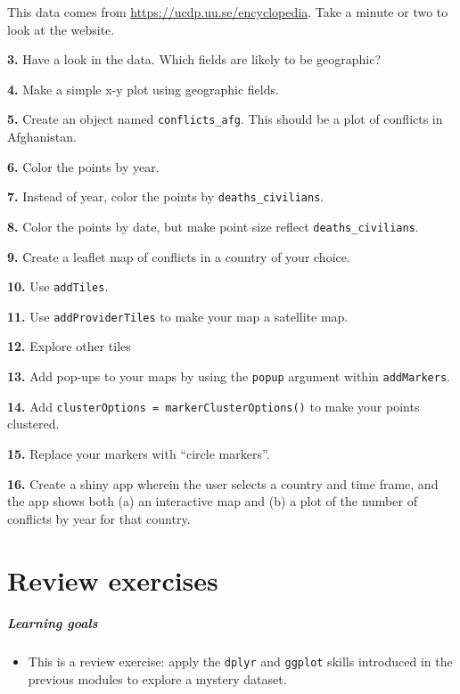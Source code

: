 \documentclass[
]{book}
\providecommand{\tightlist}{%
  \setlength{\itemsep}{0pt}\setlength{\parskip}{0pt}}
\begin{document}
This data comes from \url{https://ucdp.uu.se/encyclopedia}. Take a minute or two to look at the website.

\textbf{3.} Have a look in the data. Which fields are likely to be geographic?

\textbf{4.} Make a simple x-y plot using geographic fields.

\textbf{5.} Create an object named \texttt{conflicts\_afg}. This should be a plot of conflicts in Afghanistan.

\textbf{6.} Color the points by year.

\textbf{7.} Instead of year, color the points by \texttt{deaths\_civilians}.

\textbf{8.} Color the points by date, but make point size reflect \texttt{deaths\_civilians}.

\textbf{9.} Create a leaflet map of conflicts in a country of your choice.

\textbf{10.} Use \texttt{addTiles}.

\textbf{11.} Use \texttt{addProviderTiles} to make your map a satellite map.

\textbf{12.} Explore other tiles

\textbf{13.} Add pop-ups to your maps by using the \texttt{popup} argument within \texttt{addMarkers}.

\textbf{14.} Add \texttt{clusterOptions\ =\ markerClusterOptions()} to make your points clustered.

\textbf{15.} Replace your markers with ``circle markers''.

\textbf{16.} Create a shiny app wherein the user selects a country and time frame, and the app shows both (a) an interactive map and (b) a plot of the number of conflicts by year for that country.

\hypertarget{part-review-exercises}{%
\part{Review exercises}\label{part-review-exercises}}

\hypertarget{learning-goals-13}{%
\subsubsection*{Learning goals}\label{learning-goals-13}}

\begin{itemize}
\tightlist
\item
  This is a review exercise: apply the \texttt{dplyr} and \texttt{ggplot} skills introduced in the previous modules to explore a mystery dataset.
\end{itemize}
\end{document}
